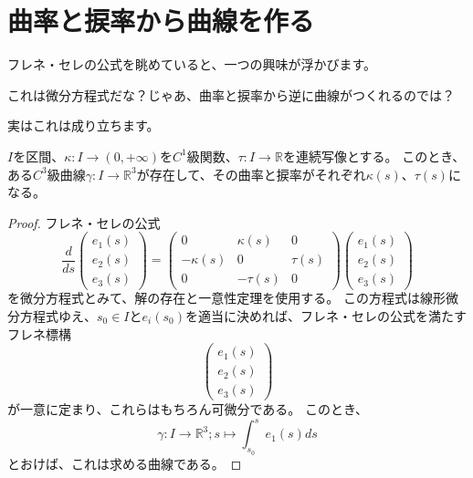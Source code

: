 \section{曲率と捩率から曲線を作る}

フレネ・セレの公式を眺めていると、一つの興味が浮かびます。
\begin{center}
  これは微分方程式だな？じゃあ、曲率と捩率から逆に曲線がつくれるのでは？
\end{center}
実はこれは成り立ちます。
\begin{theorem}
  $I$を区間、$\kappa:I\to(0,+\infty)$を$C^1$級関数、$\tau:I\to\mathbb{R}$を連続写像とする。
  このとき、ある$C^3$級曲線$\gamma:I\to\mathbb{R}^3$が存在して、その曲率と捩率がそれぞれ$\kappa(s)$、$\tau(s)$になる。
\end{theorem}
\begin{proof}
  フレネ・セレの公式
  \[
    \frac{d}{ds}
    \begin{pmatrix}
      e_1(s)\\
      e_2(s)\\
      e_3(s)
    \end{pmatrix}
    =
    \begin{pmatrix}
      0 & \kappa(s) & 0 \\
      -\kappa(s) & 0 & \tau(s) \\
      0 & -\tau(s) & 0
    \end{pmatrix}
    \begin{pmatrix}
      e_1(s)\\
      e_2(s)\\
      e_3(s)
    \end{pmatrix}
  \]
  を微分方程式とみて、解の存在と一意性定理を使用する。
  この方程式は線形微分方程式ゆえ、$s_0\in I$と$e_i(s_0)$を適当に決めれば、フレネ・セレの公式を満たすフレネ標構
  \[
    \begin{pmatrix}
      e_1(s)\\
      e_2(s)\\
      e_3(s)
    \end{pmatrix}
  \]
  が一意に定まり、これらはもちろん可微分である。
  このとき、
  \[
    \gamma:I\to \mathbb{R}^3;s\mapsto\int_{s_0}^s e_1(s)ds
  \]
  とおけば、これは求める曲線である。


\end{proof}
